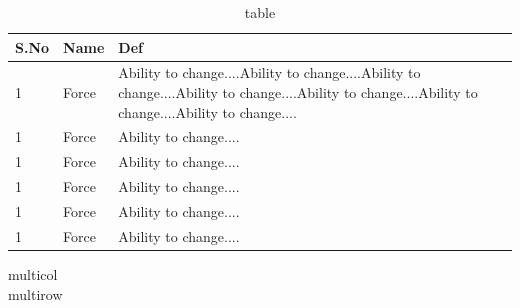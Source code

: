 \documentclass[a4paper,12pt]{book}%
\begin{document}
\begin{table}[t]
\centering
\caption{table\label{tab:tableone}}
\begin{tabular}{|p{.25\linewidth}|p{.25\linewidth}|p{.5\linewidth}|}
\hline
S.No&Name&Def\\
\hline
1&Force&Ability to change....Ability to change....Ability to change....Ability to change....Ability to change....Ability to change....Ability to change....\\
1&Force&Ability to change....\\
1&Force&Ability to change....\\
1&Force&Ability to change....\\
1&Force&Ability to change....\\
1&Force&Ability to change....\\
\hline
\end{tabular}
\end{table}

multicol\\multirow
\end{document}
